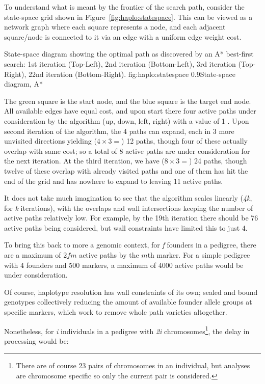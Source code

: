 To understand what is meant by the frontier of the search path, consider the state-space grid shown in Figure~\ref{fig:haplo:statespace}. This can be viewed as a network graph where each square represents a node, and each adjacent square/node is connected to it via an edge with a uniform edge weight cost.

	{State-space diagram showing the optimal path as discovered by an A* best-first search: 1st iteration (Top-Left), 2nd iteration (Bottom-Left), 3rd iteration (Top-Right), 22nd iteration (Bottom-Right).}
	{fig:haplo:statespace}
	{0.9}{State-space diagram, A*}
	
The green square is the start node, and the blue square is the target end node. All available edges have equal cost, and upon start there four active paths under consideration by the algorithm (up, down, left, right) with a value of 1 . Upon second iteration of the algorithm, the 4 paths can expand, each in 3 more unvisited directions yielding ($4 \times 3 = $) 12 paths, though four of these actually overlap with same cost; so a total of 8 active paths are under consideration for the next iteration. At the third iteration, we have ($8 \times 3 = $) 24 paths, though twelve of these overlap with already visited paths and one of them  has hit the end of the grid and has nowhere to expand to leaving 11 active paths.

It does not take much imagination to see that the algorithm scales linearly (\textit{4k}, for \textit{k} iterations), with the overlaps and wall intersections keeping the number of active paths relatively low. For example, by the 19th iteration there should be 76 active paths being considered, but wall constraints  have limited this to just 4.

To bring this back to more a genomic context, for \textit{f} founders in a pedigree, there are a maximum of $2fm$ active paths by the $m$th marker. For a simple pedigree with 4 founders and 500 markers, a maximum of 4000 active paths would be under consideration.

Of course, haplotype resolution has wall constraints of its own; sealed and bound genotypes  collectively reducing the amount of available founder allele groups at specific markers, which work to remove whole path varieties altogether.

Nonetheless, for \textit{i} individuals in a pedigree with \textit{2i} chromosomes\footnote{There are of course 23 pairs of chromosomes in an individual, but analyses are chromosome specific so only the current pair is considered.}, the delay in processing would be:

